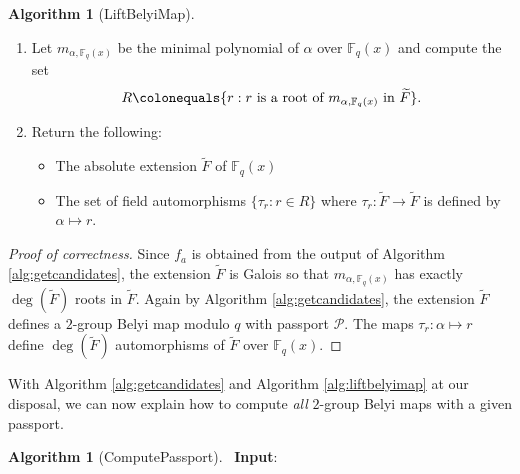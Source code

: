 \documentclass{dcthesis}
\newcommand{\mm}[1]{{\color{blue} \sf MM: [#1]}}
\newcommand{\wt}[1]{\widetilde{#1}}
\newcommand{\FF}{\mathbb{F}}
\numberwithin{equation}{section}
\theoremstyle{definition}
\newtheorem{alg}[equation]{Algorithm}
\theoremstyle{remark}
\begin{document}
{{{\begin{alg}[LiftBelyiMap]
\begin{enumerate}
          $\FF_q(x)(\alpha)$.
        \item
          Let $m_{\alpha,\FF_q(x)}$ be the
          minimal polynomial of $\alpha$
          over $\FF_q(x)$ and compute the set
          \begin{equation}
            \label{eqn:factorminpoly}
            R\colonequals
            \{
              r:r\text{ is a root of }
              m_{\alpha,\FF_q(x)}
              \text{ in }
              \wt{F}
            \}.
          \end{equation}
        \item
          Return the following:
          \begin{itemize}
            \item
              The absolute extension $\wt{F}$ of
              $\FF_q(x)$
            \item
              The set of field automorphisms
              $\{\tau_r:r\in R\}$
              where $\tau_r\colon\wt{F}\to\wt{F}$
              is defined by
              $\alpha\mapsto r$.
          \end{itemize}
      \end{enumerate}
    \end{alg}
    \begin{proof}[Proof of correctness]
      Since $f_a$ is obtained from
      the output of
      Algorithm
      \ref{alg:getcandidates},
      the extension
      $\wt{F}$ is Galois
      so that $m_{\alpha,\FF_q(x)}$
      has exactly $\deg(\wt{F})$ roots
      in $\wt{F}$.
      Again by Algorithm
      \ref{alg:getcandidates},
      the extension $\wt{F}$
      defines a $2$-group
      Belyi map modulo $q$
      with passport $\mathcal{P}$.
      The maps $\tau_r\colon\alpha\mapsto r$ define
      $\deg(\wt{F})$ automorphisms of $\wt{F}$
      over $\FF_q(x)$.
    \end{proof}
    With
    Algorithm \ref{alg:getcandidates}
    and Algorithm \ref{alg:liftbelyimap}
    at our disposal,
    we can now explain how to
    compute \emph{all} $2$-group Belyi maps
    with a given passport.
    \begin{alg}[ComputePassport]
      \label{alg:computepassport}
      \,
      \newline
      \textbf{Input}:
      \begin{itemize}

\end{itemize}
\end{alg}}}}
\end{document}

